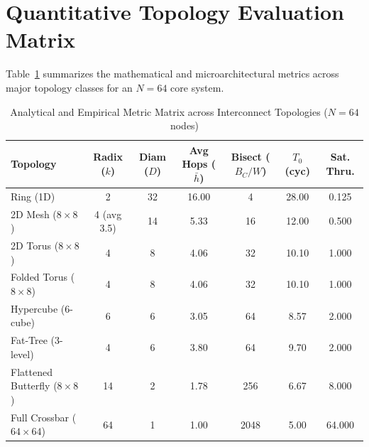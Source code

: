 \section{Quantitative Topology Evaluation Matrix}
\label{sec:ch4_summary_table}

Table~\ref{tab:ch4_metrics} summarizes the mathematical and microarchitectural metrics across major topology classes for an $N = 64$ core system.

\begin{table}[htbp]
\centering
\caption{Analytical and Empirical Metric Matrix across Interconnect Topologies ($N = 64$ nodes)}
\label{tab:ch4_metrics}
\begin{tabular}{lcccccc}
\toprule
\textbf{Topology} & \textbf{Radix ($k$)} & \textbf{Diam ($D$)} & \textbf{Avg Hops ($\bar{h}$)} & \textbf{Bisect ($B_C/W$)} & \textbf{$T_0$ (cyc)} & \textbf{Sat. Thru.} \\
\midrule
Ring (1D)                 & 2        & 32 & 16.00 & 4   & 28.00 & 0.125 \\
2D Mesh ($8 \times 8$)    & 4 (avg 3.5)& 14 & 5.33  & 16  & 12.00 & 0.500 \\
2D Torus ($8 \times 8$)   & 4        & 8  & 4.06  & 32  & 10.10 & 1.000 \\
Folded Torus ($8 \times 8$)& 4       & 8  & 4.06  & 32  & 10.10 & 1.000 \\
Hypercube (6-cube)        & 6        & 6  & 3.05  & 64  & 8.57  & 2.000 \\
Fat-Tree (3-level)        & 4        & 6  & 3.80  & 64  & 9.70  & 2.000 \\
Flattened Butterfly ($8 \times 8$) & 14 & 2 & 1.78  & 256 & 6.67  & 8.000 \\
Full Crossbar ($64 \times 64$) & 64  & 1  & 1.00  & 2048& 5.00  & 64.000 \\
\bottomrule
\end{tabular}
\end{table}

